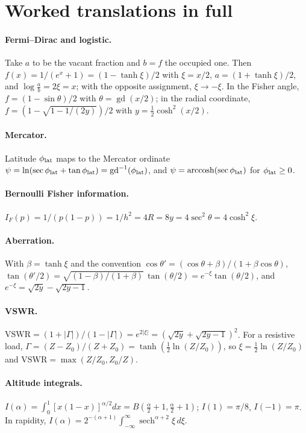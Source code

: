 \documentclass[11pt]{article}
\theoremstyle{definition}
\theoremstyle{remark}
\newcommand{\gd}{\operatorname{gd}}
\newcommand{\sech}{\operatorname{sech}}
\begin{document}
\appendix
\section{Worked translations in full}\label{app:pairs}

\paragraph{Fermi--Dirac and logistic.} Take $a$ to be the vacant fraction and $b=f$ the
occupied one. Then $f(x)=1/(e^x+1)=(1-\tanh\xi)/2$ with $\xi=x/2$, $a=(1+\tanh\xi)/2$, and
$\log\frac{a}{b}=2\xi=x$; with the opposite assignment, $\xi\to-\xi$. In the Fisher angle,
$f=(1-\sin\theta)/2$ with $\theta=\gd(x/2)$; in the radial coordinate,
$f=(1-\sqrt{1-1/(2y)})/2$ with $y=\tfrac12\cosh^2(x/2)$.

\paragraph{Mercator.} Latitude $\phi_{\rm lat}$ maps to the Mercator ordinate
$\psi=\ln(\sec\phi_{\rm lat}+\tan\phi_{\rm lat})=\gd^{-1}(\phi_{\rm lat})$, and
$\psi=\mathrm{arccosh}(\sec\phi_{\rm lat})$ for $\phi_{\rm lat}\ge0$.

\paragraph{Bernoulli Fisher information.} $I_F(p)=1/(p(1-p))=1/h^2=4R=8y
=4\sec^2\theta=4\cosh^2\xi$.

\paragraph{Aberration.} With $\beta=\tanh\xi$ and the convention
$\cos\theta'=(\cos\theta+\beta)/(1+\beta\cos\theta)$,
$\tan(\theta'/2)=\sqrt{(1-\beta)/(1+\beta)}\,\tan(\theta/2)=e^{-\xi}\tan(\theta/2)$, and
$e^{-\xi}=\sqrt{2y}-\sqrt{2y-1}$.

\paragraph{VSWR.} $\mathrm{VSWR}=(1+|\Gamma|)/(1-|\Gamma|)=e^{2|\xi|}
=(\sqrt{2y}+\sqrt{2y-1})^2$. For a resistive load,
$\Gamma=(Z-Z_0)/(Z+Z_0)=\tanh(\tfrac12\ln(Z/Z_0))$, so $\xi=\tfrac12\ln(Z/Z_0)$ and
$\mathrm{VSWR}=\max(Z/Z_0,Z_0/Z)$.

\paragraph{Altitude integrals.} $I(\alpha)=\int_0^1[x(1-x)]^{\alpha/2}dx
=B(\tfrac\alpha2+1,\tfrac\alpha2+1)$; $I(1)=\pi/8$, $I(-1)=\pi$. In rapidity,
$I(\alpha)=2^{-(\alpha+1)}\int_{-\infty}^\infty\sech^{\alpha+2}\xi\,d\xi$.
\end{document}
